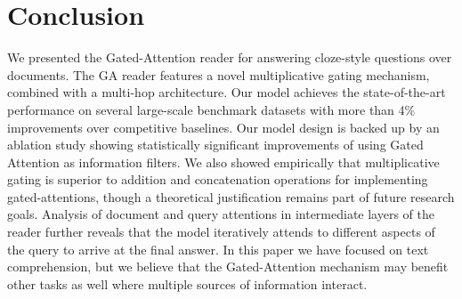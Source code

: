 \documentclass[11pt,a4paper]{article}
\newcommand{\red}[1]{\textcolor{red}{#1}}
\newcommand{\blue}[1]{\textcolor{blue}{#1}}
\begin{document}

\section{Conclusion}
\label{sec:conclusion}
We presented the Gated-Attention reader for answering cloze-style questions over documents.
The GA reader features a novel multiplicative gating mechanism, combined with a multi-hop architecture.
Our model achieves the state-of-the-art performance on several large-scale benchmark datasets with more than 4\% improvements over competitive baselines. Our model design is backed up by an ablation study showing statistically significant improvements of using Gated Attention as information filters. We also showed empirically that multiplicative gating is superior to addition and concatenation operations for implementing gated-attentions, though a theoretical justification remains part of future research goals. Analysis of document and query attentions in intermediate layers of the reader further reveals that the model iteratively attends to different aspects of the query to arrive at the final answer. In this paper we have focused on text comprehension, but we believe that the Gated-Attention mechanism may benefit other tasks as well where multiple sources of information interact.
\end{document}

